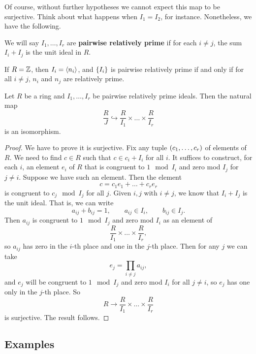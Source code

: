 Of course, without further hypotheses we cannot expect this map to be surjective. Think about what happens when $ I_1 = I_2 $, for instance. Nonetheless, we have the following.

\begin{definition}
We will say $ I_1, \dots, I_r $ are \textbf{pairwise relatively prime} if for each $ i \ne j $, the sum $ I_i + I_j $ is the unit ideal in $ R $.
\end{definition}

If $ R = \mathbb{Z} $, then $ I_i = \left\langle n_i \right\rangle $, and $ \left\{ I_i \right\} $ is pairwise relatively prime if and only if for all $ i \ne j $, $ n_i $ and $ n_j $ are relatively prime.

\begin{theorem}
Let $ R $ be a ring and $ I_1, \dots, I_r $ be pairwise relatively prime ideals. Then the natural map
$$ \dfrac{R}{J} \hookrightarrow \dfrac{R}{I_1} \times \dots \times \dfrac{R}{I_r} $$
is an isomorphism.
\end{theorem}

\begin{proof}
We have to prove it is surjective. Fix any tuple $ \left( c_1, \dots, c_r \right) $ of elements of $ R $. We need to find $ c \in R $ such that $ c \in c_i + I_i $ for all $ i $. It suffices to construct, for each $ i $, an element $ e_i $ of $ R $ that is congruent to $ 1 \mod I_i $ and zero mod $ I_j $ for $ j \ne i $. Suppose we have such an element. Then the element
$$ c = c_1e_1 + \dots + c_re_r $$
is congruent to $ c_j \mod I_j $ for all $ j $. Given $ i, j $ with $ i \ne j $, we know that $ I_i + I_j $ is the unit ideal. That is, we can write
$$ a_{ij} + b_{ij} = 1, \qquad a_{ij} \in I_i, \qquad b_{ij} \in I_j. $$
Then $ a_{ij} $ is congruent to $ 1 \mod I_j $ and zero mod $ I_i $ as an element of
$$ \dfrac{R}{I_1} \times \dots \times \dfrac{R}{I_r}, $$
so $ a_{ij} $ has zero in the $ i $-th place and one in the $ j $-th place. Then for any $ j $ we can take
$$ e_j = \prod_{i \ne j} a_{ij}, $$
and $ e_j $ will be congruent to $ 1 \mod I_j $ and zero mod $ I_i $ for all $ j \ne i $, so $ e_j $ has one only in the $ j $-th place. So
$$ R \to \dfrac{R}{I_1} \times \dots \times \dfrac{R}{I_r} $$
is surjective. The result follows.
\end{proof}

\pagebreak

\subsection{Examples}

